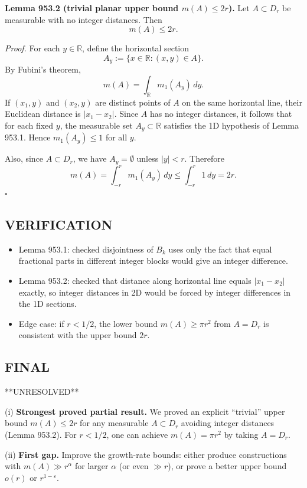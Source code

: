 \medskip
\noindent\textbf{Lemma 953.2 (trivial planar upper bound $m(A)\le 2r$).}
Let $A\subset D_r$ be measurable with no integer distances. Then
\[
m(A)\le 2r.
\]

\medskip
\noindent\emph{Proof.}
For each $y\in\mathbb R$, define the horizontal section
\[
A_y:=\{x\in\mathbb R:(x,y)\in A\}.
\]
By Fubini's theorem,
\[
m(A)=\int_{\mathbb R} m_1(A_y)\,dy.
\]
If $(x_1,y)$ and $(x_2,y)$ are distinct points of $A$ on the same horizontal line, their Euclidean distance is $|x_1-x_2|$.
Since $A$ has no integer distances, it follows that for each fixed $y$, the measurable set $A_y\subset\mathbb R$ satisfies the 1D hypothesis of Lemma 953.1.
Hence $m_1(A_y)\le1$ for all $y$.

Also, since $A\subset D_r$, we have $A_y=\emptyset$ unless $|y|<r$.
Therefore
\[
m(A)=\int_{-r}^{r} m_1(A_y)\,dy\le \int_{-r}^{r} 1\,dy=2r.
\]
\hfill $\square$

\subsection*{VERIFICATION}
\begin{itemize}
\item Lemma 953.1: checked disjointness of $B_k$ uses only the fact that equal fractional parts in different integer blocks would give an integer difference.
\item Lemma 953.2: checked that distance along horizontal line equals $|x_1-x_2|$ exactly, so integer distances in 2D would be forced by integer differences in the 1D sections.
\item Edge case: if $r<1/2$, the lower bound $m(A)\ge \pi r^2$ from $A=D_r$ is consistent with the upper bound $2r$.
\end{itemize}

\subsection*{FINAL}
**UNRESOLVED**

(i) \textbf{Strongest proved partial result.}
We proved an explicit ``trivial'' upper bound $m(A)\le 2r$ for any measurable $A\subset D_r$ avoiding integer distances (Lemma 953.2). For $r<1/2$, one can achieve $m(A)=\pi r^2$ by taking $A=D_r$.

(ii) \textbf{First gap.}
Improve the growth-rate bounds: either produce constructions with $m(A)\gg r^{\alpha}$ for larger $\alpha$ (or even $\gg r$), or prove a better upper bound $o(r)$ or $r^{1-\varepsilon}$.

